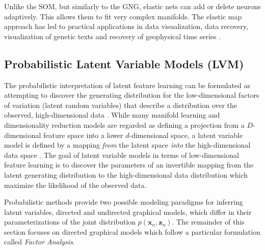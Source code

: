 Unlike the SOM, but similarly to the GNG, elastic nets can add or delete neurons adaptively.  This allows them to fit very complex manifolds.  The elastic map approach has led to practical applications in data visualization, data recovery, visualization of genetic texts and recovery of geophysical time series \citep{Gorban2007ElasticMaps}.


\subsection{Probabilistic Latent Variable Models (LVM)} \label{sec:LVM}
The probabilistic interpretation of latent feature learning can be formulated as attempting to discover the generating distribution for the low-dimensional factors of variation (latent random variables) that describe a distribution over the observed, high-dimensional data \citep{Bengio2014RepLearningReview,Murphy2012}.
While many manifold learning and dimensionality reduction models are regarded as defining a projection from a $D$-dimensional feature space into a lower $d$-dimensional space, a latent variable model is defined by a mapping \textit{from} the latent space \textit{into} the high-dimensional data space \citep{Bishop1998GTM}.  The goal of latent variable models in terms of low-dimensional feature learning is to discover the parameters of an invertible mapping from the latent generating distribution to the high-dimensional data distribution which maximize the likelihood of the observed data.  

Probabilistic methods provide two possible modeling paradigms for inferring latent variables, directed and undirected graphical models, which differ in their parameterizations of the joint distribution $p(\bm{x}_{n},\bm{z}_{n})$.  The remainder of this section focuses on directed graphical models which follow a particular formulation called \textit{Factor Analysis}. 


